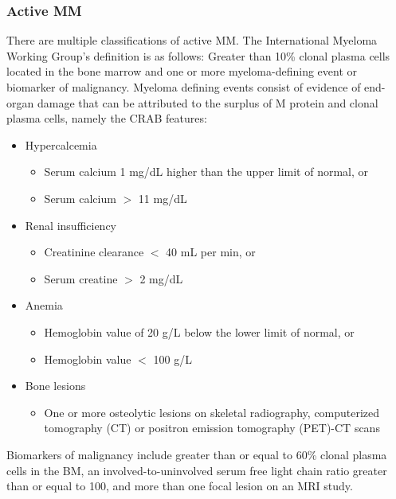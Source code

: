 \subsubsection{Active MM}
There are multiple classifications of active MM.
The International Myeloma Working Group's definition\cite{rajkumar2014international} is as follows:
Greater than 10\% clonal plasma cells located in the bone marrow and one or more myeloma-defining event or biomarker of malignancy.
Myeloma defining events consist of evidence of end-organ damage that can be attributed to the surplus of M protein and clonal plasma cells, namely the CRAB features:
%
\begin{itemize}
  \item Hypercalcemia
    \begin{itemize}
        \item Serum calcium 1 mg/dL higher than the upper limit of normal, or
        \item Serum calcium $>$ 11 mg/dL
    \end{itemize}
  \item Renal insufficiency
    \begin{itemize}
        \item Creatinine clearance $<$ 40 mL per min, or
        \item Serum creatine $>$ 2 mg/dL
  \end{itemize}
  \item Anemia
    \begin{itemize}
        \item Hemoglobin value of 20 g/L below the lower limit of normal, or
        \item Hemoglobin value $<$ 100 g/L
    \end{itemize}
    \item Bone lesions
      \begin{itemize}
        \item One or more osteolytic lesions on skeletal radiography, computerized tomography (CT) or positron emission tomography (PET)-CT scans
        \end{itemize}
\end{itemize}
%

\noindent
Biomarkers of malignancy include greater than or equal to 60\% clonal plasma cells in the BM, an involved-to-uninvolved serum free light chain ratio greater than or equal to 100, and more than one focal lesion on an MRI study\cite{rajkumar2014international}.

